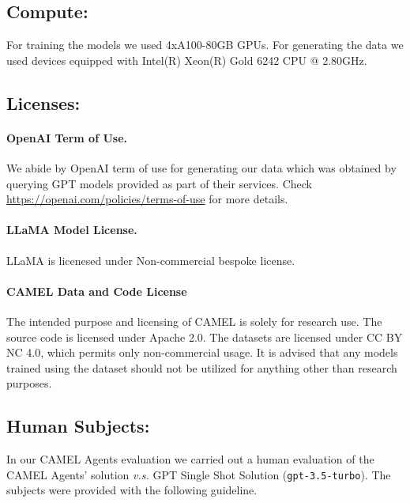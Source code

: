 \subsection{Compute:} For training the models we used 4xA100-80GB GPUs. For generating the data we used devices equipped with Intel(R) Xeon(R) Gold 6242 CPU @ 2.80GHz.

\subsection{Licenses:}

\paragraph{OpenAI Term of Use.} We abide by OpenAI term of use for generating our data which was obtained by querying GPT models provided as part of their services. Check \url{https://openai.com/policies/terms-of-use} for more details.

\paragraph{LLaMA Model License.} LLaMA is licenesed under Non-commercial bespoke license.

\paragraph{CAMEL Data and Code License}
The intended purpose and licensing of CAMEL is solely for research use. The source code is licensed under Apache 2.0. The datasets are licensed under CC BY NC 4.0, which permits only non-commercial usage. It is advised that any models trained using the dataset should not be utilized for anything other than research purposes.

\clearpage
\subsection{Human Subjects:}

In our CAMEL Agents evaluation we carried out a human evaluation of the CAMEL Agents' solution \textit{v.s.} GPT Single Shot Solution (\texttt{gpt-3.5-turbo}). The subjects were provided with the following guideline.

